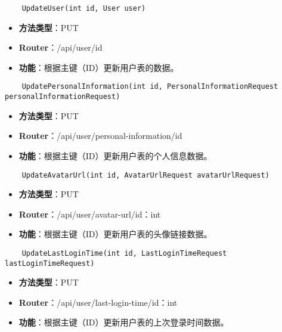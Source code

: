 \begin{verbatim}
	UpdateUser(int id, User user)
\end{verbatim}

\begin{itemize}
	\item \textbf{方法类型}：PUT
	\item \textbf{Router}：/api/user/{id}
	\item \textbf{功能}：根据主键（ID）更新用户表的数据。
\end{itemize}

\begin{verbatim}
	UpdatePersonalInformation(int id, PersonalInformationRequest personalInformationRequest)
\end{verbatim}

\begin{itemize}
	\item \textbf{方法类型}：PUT
	\item \textbf{Router}：/api/user/personal-information/{id}
	\item \textbf{功能}：根据主键（ID）更新用户表的个人信息数据。
\end{itemize}

\begin{verbatim}
	UpdateAvatarUrl(int id, AvatarUrlRequest avatarUrlRequest)
\end{verbatim}

\begin{itemize}
	\item \textbf{方法类型}：PUT
	\item \textbf{Router}：/api/user/avatar-url/{id：int}
	\item \textbf{功能}：根据主键（ID）更新用户表的头像链接数据。
\end{itemize}

\begin{verbatim}
	UpdateLastLoginTime(int id, LastLoginTimeRequest lastLoginTimeRequest)
\end{verbatim}

\begin{itemize}
	\item \textbf{方法类型}：PUT
	\item \textbf{Router}：/api/user/last-login-time/{id：int}
	\item \textbf{功能}：根据主键（ID）更新用户表的上次登录时间数据。
\end{itemize}

